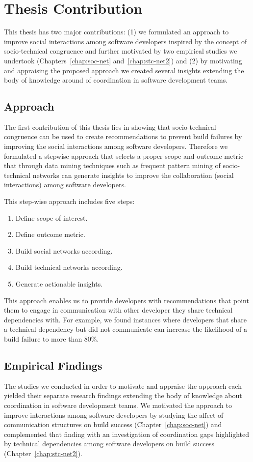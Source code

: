 \section{Thesis Contribution}
This thesis has two major contributions: (1) we formulated an approach to improve social interactions among software developers inspired by the concept of socio-technical congruence and further motivated by two empirical studies we undertook (Chapters~\ref{chap:soc-net} and~\ref{chap:stc-net2}) and (2) by motivating and appraising the proposed approach we created several insights extending the body of knowledge around of coordination in software development teams.

\subsection{Approach}
The first contribution of this thesis lies in showing that socio-technical congruence can be used to create recommendations to prevent build failures by improving the social interactions among software developers.
Therefore we formulated a stepwise approach that selects a proper scope and outcome metric that through data mining techniques such as frequent pattern mining of socio-technical networks can generate insights to improve the collaboration (social interactions) among software developers.

This step-wise approach includes five steps:
\begin{enumerate}
\item Define scope of interest.
\item Define outcome metric.
\item Build social networks according.
\item Build technical networks according.
\item Generate actionable insights.
\end{enumerate}

This approach enables us to provide developers with recommendations that point them to engage in communication with other developer they share technical dependencies with.
For example, we found instances where developers that share a technical dependency but did not communicate can increase the likelihood of a build failure to more than 80\%.


\subsection{Empirical Findings}
The studies we conducted in order to motivate and appraise the approach each yielded their separate research findings extending the body of knowledge about coordination in software development teams.
We motivated the approach to improve interactions among software developers by studying the affect of communication structures on build success (Chapter~\ref{chap:soc-net}) and complemented that finding with an investigation of coordination gaps highlighted by technical dependencies among software developers on build success (Chapter~\ref{chap:stc-net2}).

